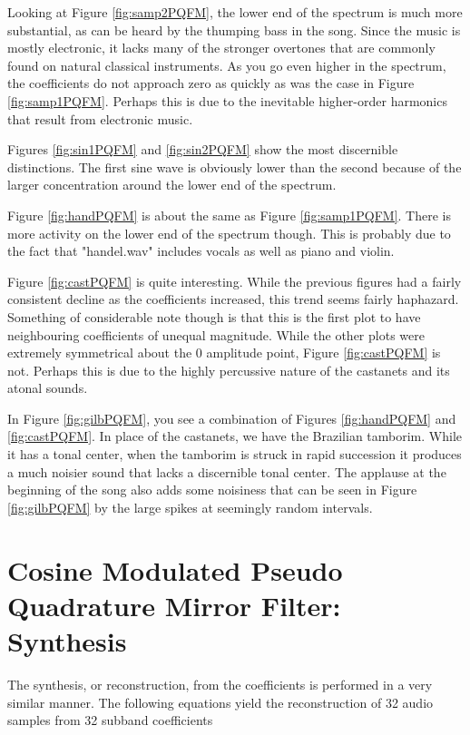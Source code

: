 \documentclass{article} %
\begin{document}
Looking at Figure \ref{fig:samp2PQFM}, the lower end of the spectrum is
much more substantial, as can be heard by the thumping bass in the song.
Since the music is mostly electronic, it lacks many of the stronger
overtones that are commonly found on natural classical instruments. As you
go even higher in the spectrum, the coefficients do not approach zero as
quickly as was the case in Figure \ref{fig:samp1PQFM}. Perhaps this is due
to the inevitable higher-order harmonics that result from electronic
music. 

Figures \ref{fig:sin1PQFM} and \ref{fig:sin2PQFM} show the most
discernible distinctions. The first sine wave is obviously lower than the
second because of the larger concentration around the lower end of the
spectrum. 

Figure \ref{fig:handPQFM} is about the same as Figure \ref{fig:samp1PQFM}.
There
is more activity on the lower end of the spectrum though. This is probably
due to the fact that "handel.wav" includes vocals as well as piano and
violin. 


Figure \ref{fig:castPQFM} is quite interesting. While the previous figures had
a fairly consistent decline as the coefficients increased, this trend
seems fairly haphazard. Something of considerable note though is that
this is the first plot to have neighbouring coefficients of unequal magnitude.
While the other plots were extremely symmetrical about the 0 amplitude point, 
Figure \ref{fig:castPQFM} is not. Perhaps this is due to the highly percussive
nature of the castanets and its atonal sounds. 

In Figure \ref{fig:gilbPQFM}, you see a combination of Figures \ref{fig:handPQFM}
and \ref{fig:castPQFM}. In place of the castanets, we have the Brazilian 
tamborim. While it has a tonal center, when the tamborim is struck in rapid
succession it produces a much noisier sound that lacks a discernible tonal
center. The applause at the beginning of the song also adds some noisiness
that can be seen in Figure \ref{fig:gilbPQFM} by the large spikes at seemingly
random intervals. 




\section{Cosine Modulated Pseudo Quadrature Mirror Filter: Synthesis}

The synthesis, or reconstruction, from the coefficients is performed
in a very similar manner. The following equations yield the reconstruction
of 32 audio samples from 32 subband coefficients
\end{document}
